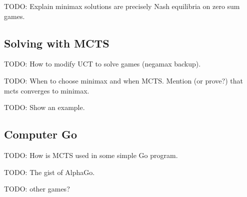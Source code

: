 TODO: Explain minimax solutions are precisely Nash equilibria on zero sum
games.

\subsection{Solving with MCTS}

TODO: How to modify UCT to solve games (negamax backup).

TODO: When to choose minimax and when MCTS.
Mention (or prove?) that mcts converges to minimax.

TODO: Show an example.

\subsection{Computer Go}

TODO: How is MCTS used in some simple Go program.

TODO: The gist of AlphaGo.

TODO: other games?
